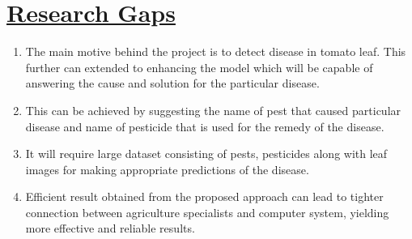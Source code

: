 \documentclass[12pt,a4paper, oneside]{article}
\begin{document}
\section{\underline{Research Gaps}}
\begin{enumerate}
    \item The main motive behind the project is to detect disease in tomato leaf. This further can extended to enhancing the model which will be capable of answering the cause and solution for the particular disease.
    \item This can be achieved by suggesting the name of pest that caused particular disease and name of pesticide that is used for the remedy of the disease.
    \item It will require large dataset consisting of pests, pesticides along with leaf images for making appropriate predictions of the disease.
    \item Efficient result obtained from the proposed approach can lead to tighter connection between agriculture specialists and computer system, yielding more effective and reliable results.
\end{enumerate}
\end{document}
